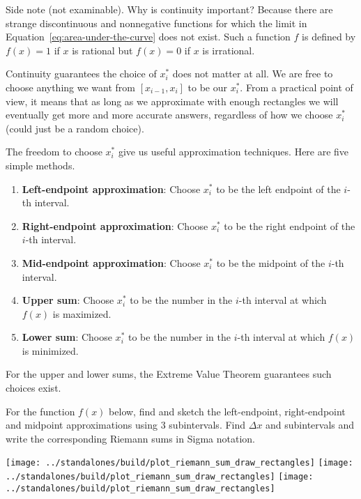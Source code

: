 \documentclass[../main.tex]{subfiles}
\begin{document}
  Side note (not examinable). Why is continuity important? Because there are strange discontinuous and nonnegative functions for which the limit in Equation~\eqref{eq:area-under-the-curve} does not exist.  Such a function \(f\) is defined by \(f(x) = 1\) if \(x\) is rational but \(f(x) = 0\) if \(x\) is irrational. 
 
  \clearpage
  Continuity guarantees the choice of \(x_{i}^{*}\) does not matter at all. We are free to choose anything we want from \([x_{i-1}, x_{i}]\) to be our \(x_{i}^{*}\). From a practical point of view, it means that as long as we approximate with enough rectangles we will eventually get more and more accurate answers, regardless of how we choose \(x_{i}^{*}\) (could just be a random choice).

  The freedom to choose \(x_{i}^{*}\) give us useful approximation techniques. Here are five simple methods.
  \begin{enumerate}
    \item \textbf{Left-endpoint approximation}: Choose \(x_{i}^{*}\) to be the left endpoint of the \(i\)-th interval.
    \item \textbf{Right-endpoint approximation}: Choose \(x_{i}^{*}\) to be the right endpoint of the \(i\)-th interval.
    \item \textbf{Mid-endpoint approximation}: Choose \(x_{i}^{*}\) to be the midpoint of the \(i\)-th interval.
    \item \textbf{Upper sum}: Choose \(x_{i}^{*}\) to be the number in the \(i\)-th interval at which \(f(x)\) is maximized.
    \item \textbf{Lower sum}: Choose \(x_{i}^{*}\) to be the number in the \(i\)-th interval at which \(f(x)\) is minimized.
  \end{enumerate}
  For the upper and lower sums, the Extreme Value Theorem guarantees such choices exist.

  \medskip
  \begin{example}
    For the function \(f(x)\) below, find and sketch the left-endpoint, right-endpoint and midpoint approximations using \(3\) subintervals. Find \(\Delta x\) and subintervals and write the corresponding Riemann sums in Sigma notation.

    \hfill{}
    \texttt{[image: ../standalones/build/plot\_riemann\_sum\_draw\_rectangles]}
    \hfill{}
    \texttt{[image: ../standalones/build/plot\_riemann\_sum\_draw\_rectangles]}
    \hfill{}
    \texttt{[image: ../standalones/build/plot\_riemann\_sum\_draw\_rectangles]}
    \hfill{}

  \end{example}
  \clearpage
\end{document}
